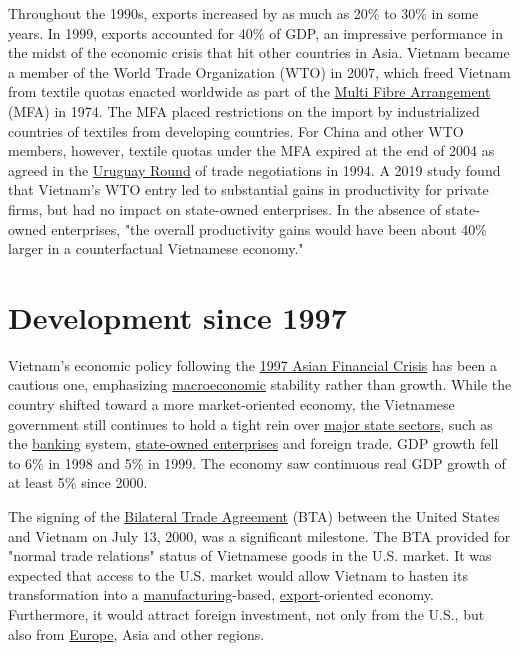 \documentclass[openany]{book}
\begin{document}
Throughout the 1990s, exports increased by as much as 20\% to 30\% in some years. In 1999, exports accounted for 40\% of GDP, an impressive performance in the midst of the economic crisis that hit other countries in Asia. Vietnam became a member of the World Trade Organization (WTO) in 2007, which freed Vietnam from textile quotas enacted worldwide as part of the \href{https://en.wikipedia.org/wiki/Multi_Fibre_Arrangement}{Multi Fibre Arrangement} (MFA) in 1974.\cite{44} The MFA placed restrictions on the import by industrialized countries of textiles from developing countries. For China and other WTO members, however, textile quotas under the MFA expired at the end of 2004 as agreed in the \href{https://en.wikipedia.org/wiki/Uruguay_Round}{Uruguay Round} of trade negotiations in 1994.\cite{36} A 2019 study found that Vietnam's WTO entry led to substantial gains in productivity for private firms, but had no impact on state-owned enterprises. In the absence of state-owned enterprises, "the overall productivity gains would have been about 40\% larger in a counterfactual Vietnamese economy."\cite{45}

\section{Development since 1997}
Vietnam's economic policy following the \href{https://en.wikipedia.org/wiki/1997_Asian_Financial_Crisis}{1997 Asian Financial Crisis} has been a cautious one, emphasizing \href{https://en.wikipedia.org/wiki/Macroeconomic}{macroeconomic} stability rather than growth. While the country shifted toward a more market-oriented economy, the Vietnamese government still continues to hold a tight rein over \href{https://en.wikipedia.org/wiki/Public_sector}{major state sectors}, such as the \href{https://en.wikipedia.org/wiki/Bank}{banking} system, \href{https://en.wikipedia.org/wiki/State-owned_enterprises}{state-owned enterprises} and foreign trade.\cite{46}\cite{47} GDP growth fell to 6\% in 1998 and 5\% in 1999. The economy saw continuous real GDP growth of at least 5\% since 2000.\cite{48}

The signing of the \href{https://en.wikipedia.org/wiki/Bilateral_Trade_Agreement}{Bilateral Trade Agreement} (BTA) between the United States and Vietnam on July 13, 2000, was a significant milestone. The BTA provided for "normal trade relations" status of Vietnamese goods in the U.S. market. It was expected that access to the U.S. market would allow Vietnam to hasten its transformation into a \href{https://en.wikipedia.org/wiki/Manufacturing}{manufacturing}-based, \href{https://en.wikipedia.org/wiki/Export}{export}-oriented economy. Furthermore, it would attract foreign investment, not only from the U.S., but also from \href{https://en.wikipedia.org/wiki/Europe}{Europe}, Asia and other regions.\cite{49}
\end{document}
